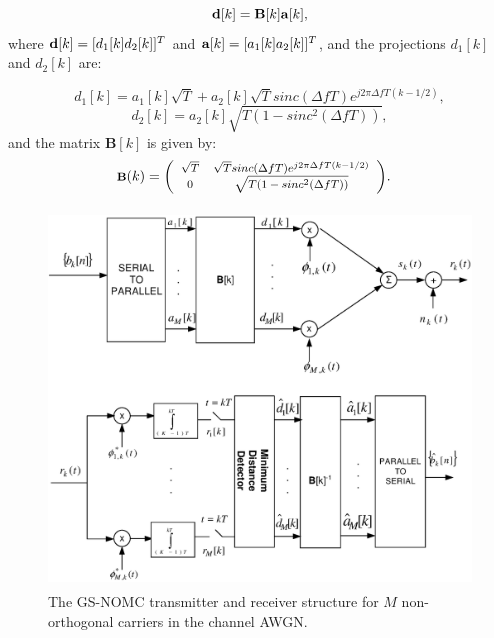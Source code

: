 \documentclass[draftcls,12pt, onecolumn, twoside]{IEEEtran}
\begin{document}
\begin{equation}\label{MatrixB}
\bold{d}[k]=\bold{B}[k]\bold{a}[k],
\end{equation}
where $\bold{d}[k]=[d_1[k] d_2[k]]^T$ and $\bold{a}[k]=[a_1[k] a_2[k]]^T$, and the projections $d_1[k]$ and $d_2[k]$ are:

\begin{equation} \label{d1}
d_1[k] =  a_1[k]\sqrt{T}+a_2[k]\sqrt{T}sinc(\Delta fT)e^{j2\pi \Delta fT(k-1/2) },
\end{equation}
\begin{equation}\label{d2}
d_2[k] =  a_2[k]\sqrt{T(1-sinc^2(\Delta fT))}, 
\end{equation}
and the matrix $\textbf{B}[k]$ is given by:
$$\scriptsize {
\textbf{B}(k)=\left(\begin{array}{cc} \sqrt{T}&\sqrt{T}sinc(\Delta fT)e^{j2\pi \Delta fT(k-1/2)}\\
0 & \sqrt{T(1-sinc^2(\Delta fT))}
\end{array}\right)}.\quad$$


\begin{figure}[!]
\begin{center}
\includegraphics[height=10cm]{GSNOMC_Mcarrier-1.eps}%
\caption{The GS-NOMC transmitter and receiver structure for $M$ non-orthogonal carriers in the channel AWGN.}
\label{GS-NOMC}
\end{center}
\end{figure}
\end{document}
